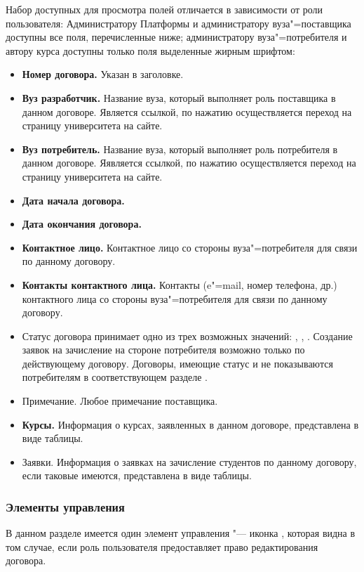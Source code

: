 Набор доступных для просмотра полей отличается в зависимости от роли пользователя: Администратору Платформы и администратору вуза"=поставщика доступны все поля, перечисленные ниже; администратору вуза"=потребителя и автору курса доступны только поля выделенные жирным шрифтом:
\begin{itemize}
	\item \textbf{Номер договора.} Указан в заголовке.
	\item \textbf{Вуз разработчик.} Название вуза, который выполняет роль поставщика в данном договоре. Является ссылкой, по нажатию осуществляется переход на страницу университета на сайте.
	\item \textbf{Вуз потребитель.} Название вуза, который выполняет роль потребителя в данном договоре. Яявляется ссылкой, по нажатию осуществляется переход на страницу университета на сайте.
	\item \textbf{Дата начала договора.}
	\item \textbf{Дата окончания договора.}
	\item \textbf{Контактное лицо.} Контактное лицо со стороны вуза"=потребителя для связи по данному договору.
	\item \textbf{Контакты контактного лица.} Контакты (e"=mail, номер телефона, др.) контактного лица со стороны вуза"=потребителя для связи по данному договору.
	\item Статус договора принимает одно из трех возможных значений: ,  ,  . Создание заявок на зачисление на стороне потребителя возможно только по действующему договору. Договоры, имеющие статус   и  не показываются потребителям в соответствующем разделе .
	\item Примечание. Любое примечание поставщика.
	\item \textbf{Курсы.} Информация о курсах, заявленных в данном договоре, представлена в виде таблицы.
	\item Заявки. Информация о заявках на зачисление студентов по данному договору, если таковые имеются, представлена в виде таблицы.
\end{itemize}

\subsubsection{Элементы управления}
В данном разделе имеется один элемент управления "--- иконка  , которая видна в том случае, если роль пользователя предоставляет право редактирования договора.


